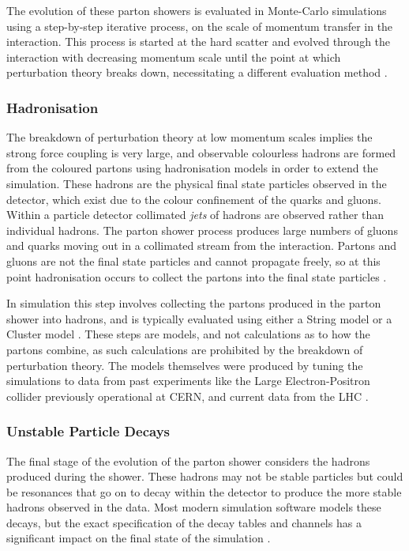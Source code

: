 			The evolution of these parton showers is evaluated in Monte-Carlo simulations using a step-by-step iterative process, on the scale of momentum transfer in the interaction. This process is started at the hard scatter and evolved through the interaction with decreasing momentum scale until the point at which perturbation theory breaks down, necessitating a different evaluation method \cite{monte-carlo}.

		\subsubsection{Hadronisation}
		\label{t:hadronisation}

			The breakdown of perturbation theory at low momentum scales implies the strong force coupling is very large, and observable colourless hadrons are formed from the coloured partons using hadronisation models in order to extend the simulation. These hadrons are the physical final state particles observed in the detector, which exist due to the colour confinement of the quarks and gluons. Within a particle detector collimated \textit{jets} of hadrons are observed rather than individual hadrons. The parton shower process produces large numbers of gluons and quarks moving out in a collimated stream from the interaction. Partons and gluons are not the final state particles and cannot propagate freely, so at this point hadronisation occurs to collect the partons into the final state particles \cite{monte-carlo}.

			In simulation this step involves collecting the partons produced in the parton shower into hadrons, and is typically evaluated using either a String model \cite{stringmodel} or a Cluster model \cite{clustermodel, monte-carlo}. These steps are models, and not calculations as to how the partons combine, as such calculations are prohibited by the breakdown of perturbation theory. The models themselves were produced by tuning the simulations to data from past experiments like the Large Electron-Positron collider previously operational at CERN, and current data from the LHC \cite{tunes, lhctunes}.

		\subsubsection{Unstable Particle Decays}

			The final stage of the evolution of the parton shower considers the hadrons produced during the shower. These hadrons may not be stable particles but could be resonances that go on to decay within the detector to produce the more stable hadrons observed in the data. Most modern simulation software models these decays, but the exact specification of the decay tables and channels has a significant impact on the final state of the simulation \cite{monte-carlo}.

